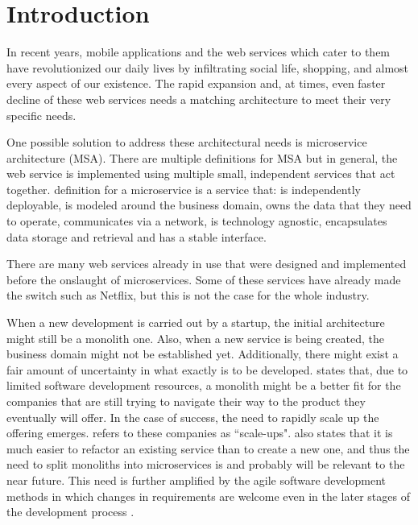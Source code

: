 


\section{Introduction}
\begin{sloppypar}
    In recent years, mobile applications and the web services which cater to
    them have revolutionized our daily lives by infiltrating social life,
    shopping, and almost every aspect of our existence. The rapid expansion and,
    at times, even faster decline of these web services needs a matching
    architecture to meet their very specific needs.
\end{sloppypar}
\begin{sloppypar} One possible solution to address these architectural needs
     is microservice architecture (MSA). There are multiple definitions for
     MSA but in general, the web service is implemented using multiple small,
     independent services that act together.
     \citet{newman2019} definition for a microservice is a service that: is
     independently deployable, is modeled around the business domain, owns the
     data that they need to operate, communicates via a network, is
     technology agnostic, encapsulates data storage and retrieval and has a stable interface.
\end{sloppypar}
\begin{sloppypar}
    There are many web services already in use that were designed and
    implemented before the onslaught of microservices. Some of these services
    have already made the switch such as Netflix, but this is not the case for
    the whole industry.
\end{sloppypar}
\begin{sloppypar}
    When a new development is carried out by a startup, the initial architecture
    might still be a monolith one. Also, when a new service is being created,
    the business domain might not be established yet. Additionally, there might
    exist a fair amount of uncertainty in what exactly is to be developed.
    \citet{newman2019} states that, due to limited software development
    resources, a monolith might be a better fit for the companies that are still
    trying to navigate their way to the product they eventually will offer. In
    the case of success, the need to rapidly scale up the offering emerges.
    \citet{newman2019} refers to these companies as ``scale-ups".
    \citet{newman2019} also states that it is much easier to refactor an
    existing service than to create a new one, and thus the need to split
    monoliths into microservices is and probably will be relevant to the near
    future. This need is further amplified by the agile software development
    methods in which changes in requirements are welcome even in the later
    stages of the development process \citep{agilemanifesto}.
\end{sloppypar}
